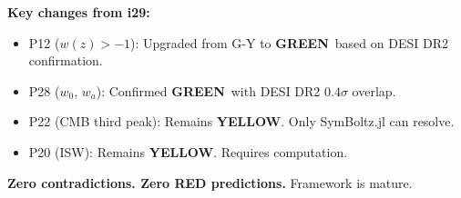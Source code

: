 \documentclass[11pt,a4paper]{article}
\newcommand{\GREEN}{\textcolor{dfdgreen}{\textbf{GREEN}}}
\newcommand{\YELLOW}{\textcolor{dfdyellow}{\textbf{YELLOW}}}
\begin{document}
\textbf{Key changes from i29:}
\begin{itemize}
\item P12 ($w(z) > -1$): Upgraded from G-Y to \GREEN\ based on DESI DR2 confirmation.
\item P28 ($w_0$, $w_a$): Confirmed \GREEN\ with DESI DR2 $0.4\sigma$ overlap.
\item P22 (CMB third peak): Remains \YELLOW. Only SymBoltz.jl can resolve.
\item P20 (ISW): Remains \YELLOW. Requires computation.
\end{itemize}

\textbf{Zero contradictions. Zero RED predictions.} Framework is mature.
\end{document}
